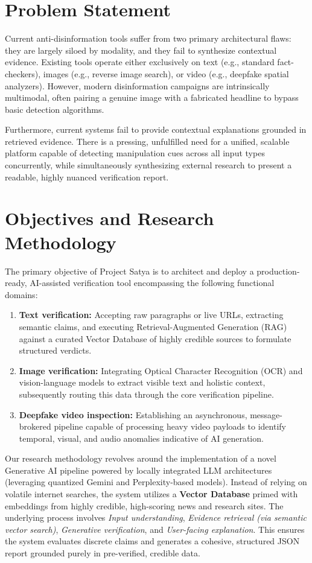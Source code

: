 \section{Problem Statement}
Current anti-disinformation tools suffer from two primary architectural flaws: they are largely siloed by modality, and they fail to synthesize contextual evidence. Existing tools operate either exclusively on text (e.g., standard fact-checkers), images (e.g., reverse image search), or video (e.g., deepfake spatial analyzers). However, modern disinformation campaigns are intrinsically multimodal, often pairing a genuine image with a fabricated headline to bypass basic detection algorithms.

Furthermore, current systems fail to provide contextual explanations grounded in retrieved evidence. There is a pressing, unfulfilled need for a unified, scalable platform capable of detecting manipulation cues across all input types concurrently, while simultaneously synthesizing external research to present a readable, highly nuanced verification report.

\section{Objectives and Research Methodology}
The primary objective of Project Satya is to architect and deploy a production-ready, AI-assisted verification tool encompassing the following functional domains:
\begin{enumerate}
    \item \textbf{Text verification:} Accepting raw paragraphs or live URLs, extracting semantic claims, and executing Retrieval-Augmented Generation (RAG) against a curated Vector Database of highly credible sources to formulate structured verdicts.
    \item \textbf{Image verification:} Integrating Optical Character Recognition (OCR) and vision-language models to extract visible text and holistic context, subsequently routing this data through the core verification pipeline.
    \item \textbf{Deepfake video inspection:} Establishing an asynchronous, message-brokered pipeline capable of processing heavy video payloads to identify temporal, visual, and audio anomalies indicative of AI generation.
\end{enumerate}

Our research methodology revolves around the implementation of a novel Generative AI pipeline powered by locally integrated LLM architectures (leveraging quantized Gemini and Perplexity-based models). Instead of relying on volatile internet searches, the system utilizes a \textbf{Vector Database} primed with embeddings from highly credible, high-scoring news and research sites. The underlying process involves \textit{Input understanding}, \textit{Evidence retrieval (via semantic vector search)}, \textit{Generative verification}, and \textit{User-facing explanation}. This ensures the system evaluates discrete claims and generates a cohesive, structured JSON report grounded purely in pre-verified, credible data.

